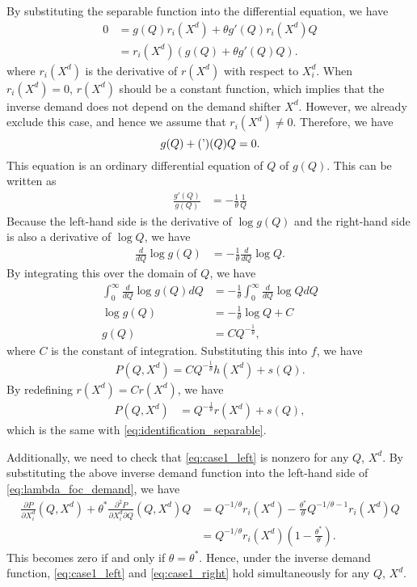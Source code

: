 \documentclass[11pt, a4paper]{article}
\theoremstyle{remark}
\begin{document}
By substituting the separable function into the differential equation, we have 
\begin{align}
   0 & =  g(Q) r_i(X^{d}) + \theta g'(Q)r_i(X^{d}) Q\\
   & = r_i(X^{d})( g(Q) + \theta g'(Q)Q).
\end{align}
where $r_i(X^{d})$ is the derivative of $r(X^{d})$ with respect to $X^{d}_i$.
When $r_i(X^{d}) = 0$, $r(X^{d})$ should be a constant function, which implies that the inverse demand does not depend on the demand shifter $X^{d}$.
However, we already exclude this case, and hence we assume that $r_i(X^{d}) \ne 0$.
Therefore, we have 
\[g(Q) + \thetag'(Q)Q = 0.\]
This equation is an ordinary differential equation of $Q$ of $g(Q)$.
This can be written as
\begin{align}
    \frac{g'(Q)}{g(Q)} &= -\frac{1}{\theta} \frac{1}{Q}
\end{align}
Because the left-hand side is the derivative of $\log g(Q)$ and the right-hand side is also a derivative of $\log Q$, we have
\begin{align}
        \frac{d}{dQ} \log g(Q) &= -\frac{1}{\theta} \frac{d}{dQ} \log Q.
\end{align}
By integrating this over the domain of $Q$, we have
\begin{align}
    \int_{0}^\infty \frac{d}{dQ} \log g(Q) dQ &= -\frac{1}{\theta} \int_{0}^\infty  \frac{d}{dQ} \log Q dQ \\
    \log g(Q) &= -\frac{1}{\theta} \log Q + C\\
    g(Q) &= C Q^{-\frac{1}{\theta}},
\end{align}
where $C$ is the constant of integration.
Substituting this into $f$, we have 
\begin{align}
    P(Q, X^{d}) = C Q^{-\frac{1}{\theta}} h(X^{d}) + s(Q).
\end{align}
By redefining $r(X^{d}) = Cr(X^{d})$, we have
\begin{align}
    P(Q, X^{d}) &= Q^{-\frac{1}{\theta}} r(X^{d}) + s(Q),
\end{align}
which is the same with \eqref{eq:identification_separable}.

Additionally, we need to check that \eqref{eq:case1_left} is nonzero for any $Q$, $X^{d}$.
By substituting the above inverse demand function into the left-hand side of \eqref{eq:lambda_foc_demand}, we have
\begin{align}
    \frac{\partial P}{\partial X^{d}_{i}}(Q, X^{d}) + \theta^{*} \frac{\partial^2 P}{\partial X^{d}_{i}\partial Q}(Q, X^{d})Q  &= Q^{-1/\theta} r_i(X^d) - \frac{\theta^{*}}{\theta} Q^{-1/\theta-1} r_i(X^d) Q\\
    &= Q^{-1/\theta} r_i(X^d) \left(1 - \frac{\theta^{*}}{\theta} \right).
\end{align}
This becomes zero if and only if $\theta= \theta^{*}$.
Hence, under the inverse demand function, \eqref{eq:case1_left} and \eqref{eq:case1_right} hold simultaneously for any $Q$, $X^{d}$.
\end{document}
